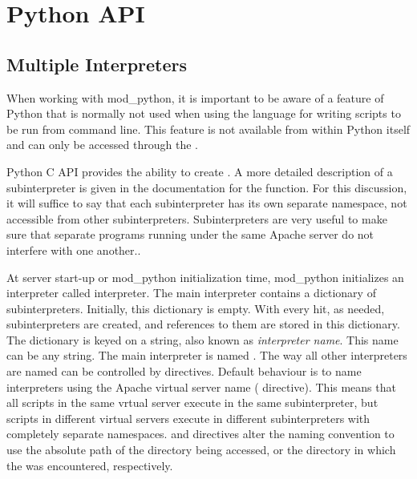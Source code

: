 \chapter{Python API\label{pythonapi}}

\section{Multiple Interpreters\label{pyapi-interps}}
      
When working with mod_python, it is important to be aware of a feature
of Python that is normally not used when using the language for
writing scripts to be run from command line. This feature is not
available from within Python itself and can only be accessed through
the .

Python C API provides the ability to create . A
more detailed description of a subinterpreter is given in the
documentation for the
function. For this discussion, it will suffice to say that each
subinterpreter has its own separate namespace, not accessible from
other subinterpreters. Subinterpreters are very useful to make sure
that separate programs running under the same Apache server do not
interfere with one another..

At server start-up or mod_python initialization time, mod_python
initializes an interpreter called  interpreter.  The main
interpreter contains a dictionary of subinterpreters. Initially, this
dictionary is empty. With every hit, as needed, subinterpreters are
created, and references to them are stored in this dictionary. The
dictionary is keyed on a string, also known as \emph{interpreter
name}. This name can be any string.  The main interpreter is named
.  The way all other interpreters are named can
be controlled by
 directives. Default behaviour is to name interpreters
using the Apache virtual server name (
directive). This means that all scripts in the same vrtual server
execute in the same subinterpreter, but scripts in different virtual
servers execute in different subinterpreters with completely separate
namespaces. 
 and
directives alter the naming convention to use the absolute path of the
directory being accessed, or the directory in which the
 was encountered, respectively.

